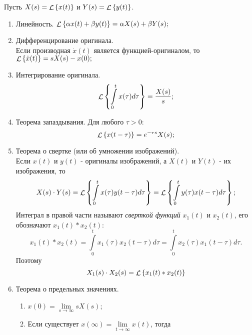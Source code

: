 \documentclass[../../TAU.tex]{subfiles}
\begin{document}
    Пусть 
    ${X(s) = \mathop{\mathcal{L}}\nolimits\left\{x(t)\right\}}$ и 
    ${Y(s) = \mathop{\mathcal{L}}\nolimits\left\{y(t)\right\}}$.
    \begin{enumerate}
        \item Линейность. ${\mathop{\mathcal{L}}\nolimits\left\{\alpha x(t) + \beta y(t)\right\} = \alpha X(s) + \beta Y(s);}$
        \item Дифференцирование оригинала. \\
            Если производная 
            $\dot x(t)$ 
            является функцией-оригиналом, то 
            ${\mathop{\mathcal{L}}\nolimits\left\{\dot x(t)\right\} = sX(s) - x(0);}$
        \item Интегрирование оригинала.
            \begin{equation}
                \mathop{\mathcal{L}}\nolimits\left\{\int\limits_0^tx(\tau)d\tau\right\} = \frac{X(s)}{s};
            \end{equation}
        \item Теорема запаздывания. Для любого $\tau>0$:
            \begin{equation}
                \mathop{\mathcal{L}}\nolimits\left\{x(t-\tau)\right\} = e^{-\tau s}X(s);
            \end{equation}
        \item  Теорема о свертке (или об умножении изображений).\\
            Если $x(t)$ и $y(t)$ - оригиналы изображений, а $X(t)$ и $Y(t)$ - их изображения, то
            \begin{equation}
                X(s)\cdot Y(s) = \mathop{\mathcal{L}}\nolimits\left\{\int\limits_0^tx(\tau)y(t-\tau)d\tau\right\} = \mathop{\mathcal{L}}\nolimits\left\{\int\limits_0^ty(\tau)x(t-\tau)d\tau\right\};
            \end{equation}
            Интеграл в правой части называют {\it сверткой функций} $x_1(t)$ и $x_2(t)$, его обозначают $x_1(t) * x_2(t)$:
            \begin{equation}
                x_1(t)*x_2(t) = \int\limits_0^t x_1(\tau) x_2(t-\tau) d{\tau} = \int\limits_0^t x_2(\tau) x_1(t-\tau)d\tau.
            \end{equation}
            Поэтому 
            \begin{equation}
                X_1(s) \cdot X_2(s) = \mathop{\mathcal{L}}\nolimits\left\{x_1(t) * x_2(t)\right\}
            \end{equation}
        \item Теорема о предельных значениях.
            \begin{enumerate}[label*={\arabic*}]
                \item 
                    ${x(0) = \lim\limits_{s\rightarrow\infty}sX(s)}$;
                \item Если существует 
                    ${x(\infty) = \lim\limits_{t\rightarrow\infty} x(t)}$, тогда 

\end{enumerate}
\end{enumerate}
\end{document}

